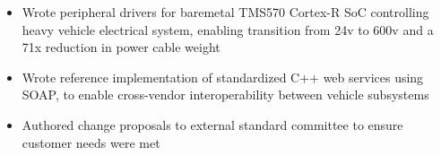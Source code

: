 \begin{itemize}
    \item Wrote peripheral drivers for baremetal TMS570 Cortex-R SoC controlling heavy vehicle electrical system, enabling transition from 24v to 600v and a 71x reduction in power cable weight
    \item Wrote reference implementation of standardized C++ web services using SOAP, to enable cross-vendor interoperability between vehicle subsystems
    \item Authored change proposals to external standard committee to ensure customer needs were met
\end{itemize}
